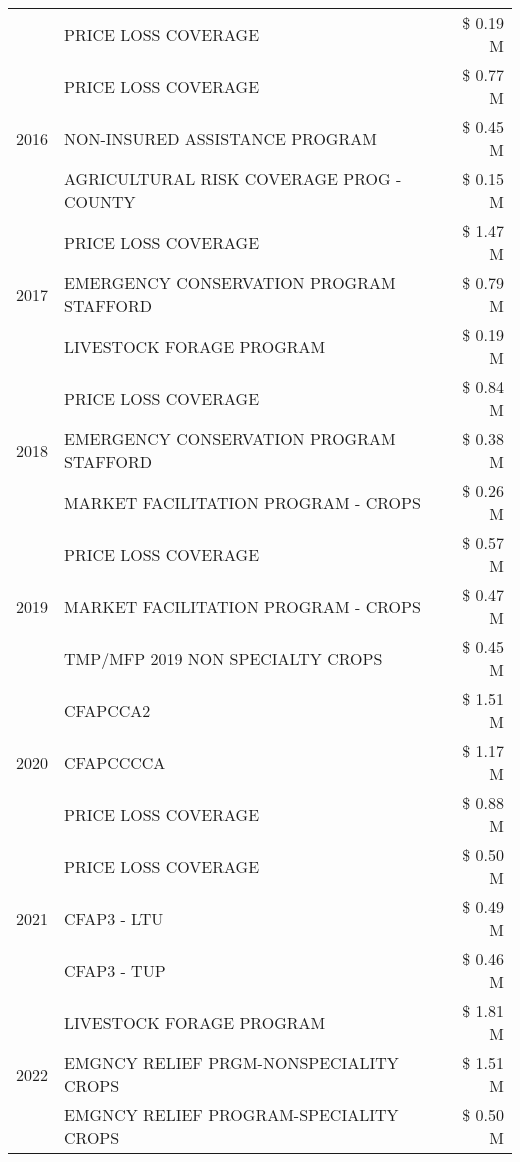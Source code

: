 \begin{tabular}{llr}
 & PRICE LOSS COVERAGE & \$ 0.19 M \\
\cline{1-3}
\multirow[t]{3}{*}{2016} & PRICE LOSS COVERAGE & \$ 0.77 M \\
 & NON-INSURED ASSISTANCE PROGRAM & \$ 0.45 M \\
 & AGRICULTURAL RISK COVERAGE PROG - COUNTY & \$ 0.15 M \\
\cline{1-3}
\multirow[t]{3}{*}{2017} & PRICE LOSS COVERAGE & \$ 1.47 M \\
 & EMERGENCY CONSERVATION PROGRAM STAFFORD & \$ 0.79 M \\
 & LIVESTOCK FORAGE PROGRAM & \$ 0.19 M \\
\cline{1-3}
\multirow[t]{3}{*}{2018} & PRICE LOSS COVERAGE & \$ 0.84 M \\
 & EMERGENCY CONSERVATION PROGRAM STAFFORD & \$ 0.38 M \\
 & MARKET FACILITATION PROGRAM - CROPS & \$ 0.26 M \\
\cline{1-3}
\multirow[t]{3}{*}{2019} & PRICE LOSS COVERAGE & \$ 0.57 M \\
 & MARKET FACILITATION PROGRAM - CROPS & \$ 0.47 M \\
 & TMP/MFP 2019 NON SPECIALTY CROPS & \$ 0.45 M \\
\cline{1-3}
\multirow[t]{3}{*}{2020} & CFAPCCA2 & \$ 1.51 M \\
 & CFAPCCCCA & \$ 1.17 M \\
 & PRICE LOSS COVERAGE & \$ 0.88 M \\
\cline{1-3}
\multirow[t]{3}{*}{2021} & PRICE LOSS COVERAGE & \$ 0.50 M \\
 & CFAP3 - LTU & \$ 0.49 M \\
 & CFAP3 - TUP & \$ 0.46 M \\
\cline{1-3}
\multirow[t]{3}{*}{2022} & LIVESTOCK FORAGE PROGRAM & \$ 1.81 M \\
 & EMGNCY RELIEF PRGM-NONSPECIALITY CROPS & \$ 1.51 M \\
 & EMGNCY RELIEF PROGRAM-SPECIALITY CROPS & \$ 0.50 M \\
\cline{1-3}
\bottomrule
\end{tabular}
